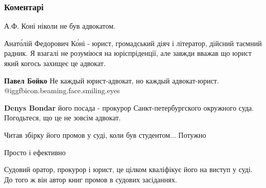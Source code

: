  
 
 
 
 
\subsubsection{Коментарі}
\label{sec:25_10_2021.fb.bojko_pavel.kiev.investor.1.advokat_rechj_korotkaja.cmt}

\begin{itemize} %
А.Ф. Коні ніколи не був адвокатом.

\begin{itemize} %
Анато́лій Федорович Ко́ні - юрист, громадський діяч і літератор, дійсний таємний радник. Я взагалі не розуміюся на юріспріденції, але завжди вважав що юрист який когось захищеє це адвокат.

\textbf{Павел Бойко} Не каждый юрист-адвокат, но каждый адвокат-юрист.  @igg{fbicon.beaming.face.smiling.eyes} 

\textbf{Denys Bondar} його посада - прокурор Санкт-петербургского окружного суда.
Погодьтеся, що це не зовсім адвокат.
\end{itemize} %


Читав збірку його промов у суді, коли був студентом... Потужно

Просто і ефективно

Судовий оратор, прокурор і юрист, це цілком кваліфікує його на виступ у суді. До того ж він автор книг промов в судових засіданнях.

\end{itemize} %

